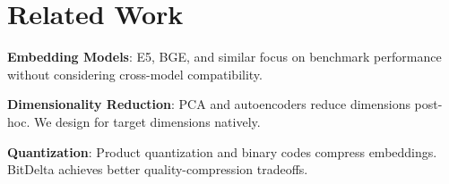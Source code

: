\section{Related Work}


\textbf{Embedding Models}: E5, BGE, and similar focus on benchmark performance without considering cross-model compatibility.

\textbf{Dimensionality Reduction}: PCA and autoencoders reduce dimensions post-hoc. We design for target dimensions natively.

\textbf{Quantization}: Product quantization and binary codes compress embeddings. BitDelta achieves better quality-compression tradeoffs.

